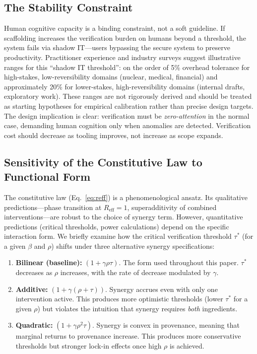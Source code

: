 \documentclass[runningheads]{llncs}
\begin{document}
\subsection{The Stability Constraint}

Human cognitive capacity is a binding constraint, not a soft guideline. If scaffolding increases the verification burden on humans beyond a threshold, the system fails via shadow IT---users bypassing the secure system to preserve productivity. Practitioner experience and industry surveys suggest illustrative ranges for this ``shadow IT threshold'': on the order of 5\% overhead tolerance for high-stakes, low-reversibility domains (nuclear, medical, financial) and approximately 20\% for lower-stakes, high-reversibility domains (internal drafts, exploratory work). These ranges are not rigorously derived and should be treated as starting hypotheses for empirical calibration rather than precise design targets. The design implication is clear: verification must be \emph{zero-attention} in the normal case, demanding human cognition only when anomalies are detected. Verification cost should decrease as tooling improves, not increase as scope expands.

\subsection{Sensitivity of the Constitutive Law to Functional Form}
\label{sec:sensitivity}

The constitutive law (Eq.~\ref{eq:reff}) is a phenomenological ansatz. Its qualitative predictions---phase transition at $R_{\mathrm{eff}} = 1$, superadditivity of combined interventions---are robust to the choice of synergy term. However, quantitative predictions (critical thresholds, power calculations) depend on the specific interaction form. We briefly examine how the critical verification threshold $\tau^*$ (for a given $\beta$ and $\rho$) shifts under three alternative synergy specifications:

\begin{enumerate}
\item \textbf{Bilinear (baseline):} $(1+\gamma\rho\tau)$. The form used throughout this paper. $\tau^*$ decreases as $\rho$ increases, with the rate of decrease modulated by $\gamma$.
\item \textbf{Additive:} $(1+\gamma(\rho+\tau))$. Synergy accrues even with only one intervention active. This produces more optimistic thresholds (lower $\tau^*$ for a given $\rho$) but violates the intuition that synergy requires \emph{both} ingredients.
\item \textbf{Quadratic:} $(1+\gamma\rho^2\tau)$. Synergy is convex in provenance, meaning that marginal returns to provenance increase. This produces more conservative thresholds but stronger lock-in effects once high $\rho$ is achieved.
\end{enumerate}
\end{document}
